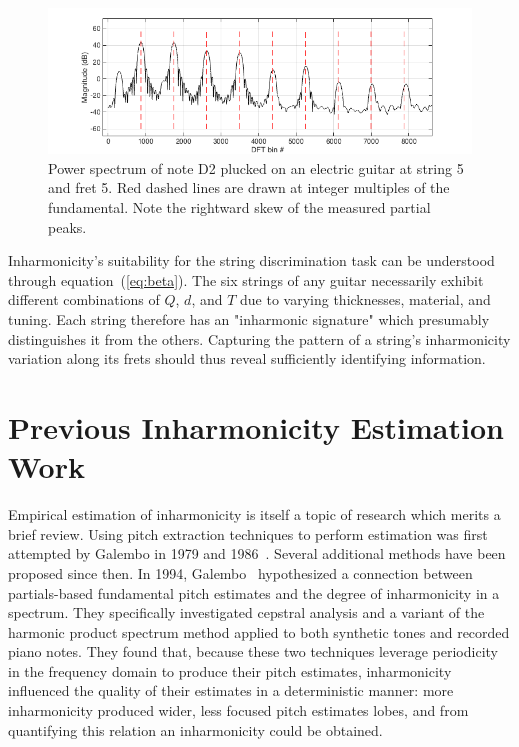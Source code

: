 \documentclass[12pt]{cmuthesis}
\begin{document}
\begin{figure}[!htbp]
\label{fig:skew}
\centering
\includegraphics[scale=0.65]{skew}
\caption{Power spectrum of note D2 plucked on an electric guitar at string 5 and fret 5. Red dashed lines are drawn at integer multiples of the fundamental. Note the rightward skew of the measured partial peaks.}
\end{figure}

Inharmonicity's suitability for the string discrimination task can be understood through equation~(\ref{eq:beta}). The six strings of any guitar necessarily exhibit different combinations of $Q$, $d$, and $T$ due to varying thicknesses, material, and tuning. Each string therefore has an "inharmonic signature" which presumably distinguishes it from the others. Capturing the pattern of a string's inharmonicity variation along its frets should thus reveal sufficiently identifying information.

\section{Previous Inharmonicity Estimation Work}
Empirical estimation of inharmonicity is itself a topic of research which merits a brief review. Using pitch extraction techniques to perform estimation was first attempted by Galembo in 1979 and 1986~\cite{galembo1979,galembo1987}. Several additional methods have been proposed since then. In 1994, Galembo~\cite{galembo1994} hypothesized a connection between partials-based fundamental pitch estimates and the degree of inharmonicity in a spectrum. They specifically investigated cepstral analysis and a variant of the harmonic product spectrum method applied to both synthetic tones and recorded piano notes. They found that, because these two techniques leverage periodicity in the frequency domain to produce their pitch estimates, inharmonicity influenced the quality of their estimates in a deterministic manner: more inharmonicity produced wider, less focused pitch estimates lobes, and from quantifying this relation an inharmonicity could be obtained.
 
\end{document}
